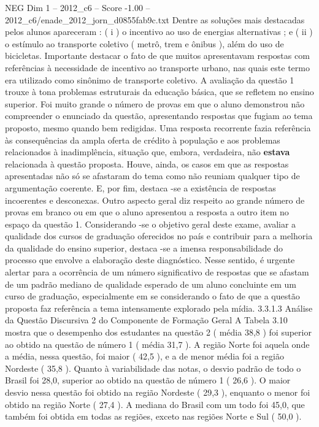 \begin{textsample}{NEG Dim 1 – 2012\_c6 – Score -1.00 – 2012\_c6/enade\_2012\_jorn\_d0855fab9c.txt}
Dentre as soluções mais destacadas pelos alunos apareceram : ( i ) o incentivo ao uso de energias alternativas ; e ( ii ) o estímulo ao transporte coletivo ( metrô, trem e ônibus ), além do uso de bicicletas.
Importante destacar o fato de que muitos apresentavam respostas com referências à necessidade de incentivo ao transporte urbano, nas quais este termo era utilizado como sinônimo de transporte coletivo.
A avaliação da questão 1 trouxe à tona problemas estruturais da educação básica, que se refletem no ensino superior.
Foi muito grande o número de provas em que o aluno demonstrou não compreender o enunciado da questão, apresentando respostas que fugiam ao tema proposto, mesmo quando bem redigidas.
Uma resposta recorrente fazia referência às consequências da ampla oferta de crédito à população e aos problemas relacionados à inadimplência, situação que, embora, verdadeira, não \textbf{estava} relacionada à questão proposta.
Houve, ainda, os casos em que as respostas apresentadas não só se afastaram do tema como não reuniam qualquer tipo de argumentação coerente.
E, por fim, destaca -se a existência de respostas incoerentes e desconexas.
Outro aspecto geral diz respeito ao grande número de provas em branco ou em que o aluno apresentou a resposta a outro item no espaço da questão 1.
Considerando -se o objetivo geral deste exame, avaliar a qualidade dos cursos de graduação oferecidos no país e contribuir para a melhoria da qualidade do ensino superior, destaca -se a imensa responsabilidade do processo que envolve a elaboração deste diagnóstico.
Nesse sentido, é urgente alertar para a ocorrência de um número significativo de respostas que se afastam de um padrão mediano de qualidade esperado de um aluno concluinte em um curso de graduação, especialmente em se considerando o fato de que a questão proposta faz referência a tema intensamente explorado pela mídia. 3.3.1.3 Análise da Questão Discursiva 2 do Componente de Formação Geral A Tabela 3.10 mostra que o desempenho dos estudantes na questão 2 ( média 38,8 ) foi superior ao obtido na questão de número 1 ( média 31,7 ).
A região Norte foi aquela onde a média, nessa questão, foi maior ( 42,5 ), e a de menor média foi a região Nordeste ( 35,8 ).
Quanto à variabilidade das notas, o desvio padrão de todo o Brasil foi 28,0, superior ao obtido na questão de número 1 ( 26,6 ).
O maior desvio nessa questão foi obtido na região Nordeste ( 29,3 ), enquanto o menor foi obtido na região Norte ( 27,4 ).
A mediana do Brasil com um todo foi 45,0, que também foi obtida em todas as regiões, exceto nas regiões Norte e Sul ( 50,0 ).

\end{textsample}
